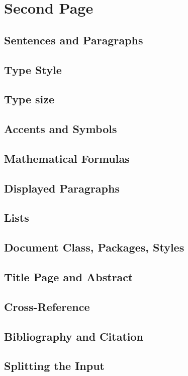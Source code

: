 \section{Second Page}
\subsection{Sentences and Paragraphs}
\subsection{Type Style}
\subsection{Type size}
\subsection{Accents and Symbols}
\subsection{Mathematical Formulas}
\subsection{Displayed Paragraphs}
\subsection{Lists}
\subsection{Document Class, Packages, Styles}
\subsection{Title Page and Abstract}
\subsection{Cross-Reference}
\subsection{Bibliography and Citation}
\subsection{Splitting the Input}
\newpage